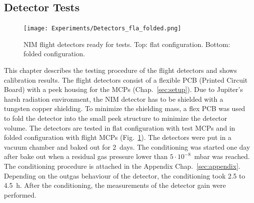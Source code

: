 	\subsection{Detector Tests }\label{chapExp:Det}
	
	\begin{figure}[h] %
		\centering
		\texttt{[image: Experiments/Detectors\_fla\_folded.png]}
		\caption{NIM flight detectors ready for tests. Top: flat configuration. Bottom: folded configuration.}
		\label{fig:DetFlatFolded}
	\end{figure}


	This chapter describes the testing procedure of the flight detectors and shows calibration results. The flight detectors consist of a flexible PCB (Printed Circuit Board) with a peek housing for the MCPs (Chap.~\ref{sec:setup}). Due to Jupiter's harsh radiation environment, the NIM detector has to be shielded with a tungsten copper shielding. To minimize the shielding mass, a flex PCB was used to fold the detector into the small peek structure to minimize the detector volume. The detectors are tested in flat configuration with test MCPs and in folded configuration with flight MCPs (Fig.~\ref{fig:DetFlatFolded}). The detectors were put in a vacuum chamber and baked out for 2~days. The conditioning was started one day after bake out when a residual gas pressure lower than $5\cdot10^{-8}$~mbar was reached. The conditioning procedure is attached in the Appendix Chap.~\ref{sec:appendix}. Depending on the outgas behaviour of the detector, the conditioning took 2.5 to 4.5~h. After the conditioning, the measurements of the detector gain were performed.\\
